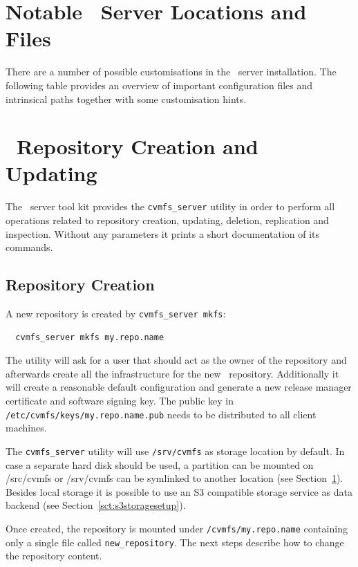 \pagebreak
\section{Notable \cvmfs\ Server Locations and Files}
\label{sct:repoanatomy}
There are a number of possible customisations in the \cvmfs\ server installation.
The following table provides an overview of important configuration files and intrinsical paths together with some customisation hints.


\section{\cvmfs\ Repository Creation and Updating}
\label{sct:repocreateandupdate}
The \cvmfs\ server tool kit provides the \texttt{cvmfs\_server} utility in order to perform all operations related to repository creation, updating, deletion, replication and inspection.
Without any parameters it prints a short documentation of its commands.

\subsection{Repository Creation}
\label{sct:repocreation}

A new repository is created by \texttt{cvmfs\_server mkfs}:
\begin{verbatim}
  cvmfs_server mkfs my.repo.name
\end{verbatim}
The utility will ask for a user that should act as the owner of the repository and afterwards create all the infrastructure for the new \cvmfs\ repository.
Additionally it will create a reasonable default configuration and generate a new release manager certificate and software signing key.
The public key in \texttt{/etc/cvmfs/keys/my.repo.name.pub} needs to be distributed to all client machines.

The \texttt{cvmfs\_server} utility will use \texttt{/srv/cvmfs} as storage location by default.
In case a separate hard disk should be used, a partition can be mounted on /src/cvmfs or /srv/cvmfs can be symlinked to another location (see Section~\ref{sct:repoanatomy}).
Besides local storage it is possible to use an S3 compatible storage service as data backend (see Section~\ref{sct:s3storagesetup}).

Once created, the repository is mounted under \texttt{/cvmfs/my.repo.name} containing only a single file called \texttt{new\_repository}.
The next steps describe how to change the repository content.


